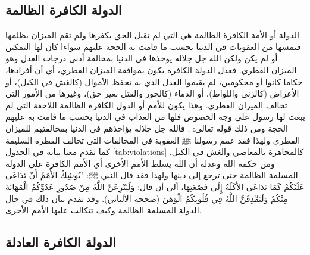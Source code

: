 
\subsection{الدولة الكافرة الظالمة}

الدولة أو الأمة الكافرة الظالمة هي التي لم تقبل الحق بكفرها ولم تقم الميزان بظلمها فيمسها من العقوبات في الدنيا بحسب ما قامت به الحجة عليهم سواءا كان لها التمكين أو لم يكن ولكن الله جل جلاله يؤخذها في الدنيا بمخالفة أدنى درجات العدل وهو الميزان الفطري. فعدل الدولة الكافرة يكون بموافقة الميزان الفطري، أي أن أفرادها، حكاما كانوا أو محكومين، لم يقيموا العدل الذي به تحفظ الأموال (كالغش في الكيل)، أو الأعراض (كالزنى واللواط)، أو الدماء (كالجور والقتل بغير حق)، وغيرها من الأمور التي تخالف الميزان الفطري. وهذا يكون للأمم أو الدول الكافرة الظالمة اللاحقة التي لم يبعث لها رسول على وجه الخصوص فلها من العذاب في الدنيا بحسب ما قامت به عليهم الحجة ومن ذلك قوله تعالى: 
\quranayah*[17][15]{\footnotesize \surahname*[17]}. فالله جل جلاله يؤاخذهم في الدنيا بمخالفتهم للميزان الفطري ولهذا فقد عمم رسولنا ﷺ العقوبة في المخالفات التي تخالف الفطرة السليمة كما تقدم معنا بيانه في الجدول \ref{tab:violations} كالمجاهرة بالمعاصي والغش في الكيل. ومن حكمة الله وعدله أن الله يسلط الأمم الأخرى أي الأمم الكافرة على الدولة المسلمة الظالمة حتى ترجع إلى دينها ولهذا فقد قال النبي ﷺ: "يُوشِكُ الأُمَمُ أَنْ تَدَاعَى عَلَيْكُمْ كَمَا تَدَاعَى الأَكَلَةُ إِلَى قَصْعَتِهَا، ألى أن قال: وَلَيَنْزِعَنَّ اللَّهُ مِنْ صُدُورِ عَدُوِّكُمُ الْمَهَابَةَ مِنْكُمْ وَلَيَقْذِفَنَّ اللَّهُ فِي قُلُوبِكُمُ الْوَهَنَ {\footnotesize (صححه الألباني)}. وقد تقدم بيان ذلك في حال الدولة المسلمة الظالمة وكيف تتكالب عليها الأمم الأخرى.

\subsection{الدولة الكافرة العادلة}

